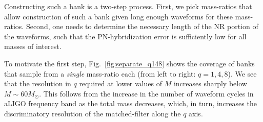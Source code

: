 \documentclass[aps,
prd,
twocolumn,
superscriptaddress,
lengthcheck,showpacs,letterpaper,nofootinbib,
floatfix]{revtex4-1}
\begin{document}
Constructing such a bank is a two-step process.  First, we pick mass-ratios 
that allow construction of such a bank given long enough waveforms for these
mass-ratios. Second, one needs to determine the necessary length of the NR 
portion of the waveforms, such that the PN-hybridization error is sufficiently
low for all masses of interest.

To motivate the first step, Fig.~\ref{fig:separate_q148} shows the coverage of
banks that sample from a {\em single} mass-ratio each (from left to right: $q=1,4,8$). We see that the resolution
in $q$ required at lower values of $M$ increases sharply below 
$M\sim 60M_\odot$. This follows from the increase in the number of waveform
cycles in aLIGO frequency band as the total mass decreases, which, in turn,
increases the discriminatory resolution of the matched-filter along the $q$ axis.
\end{document}
